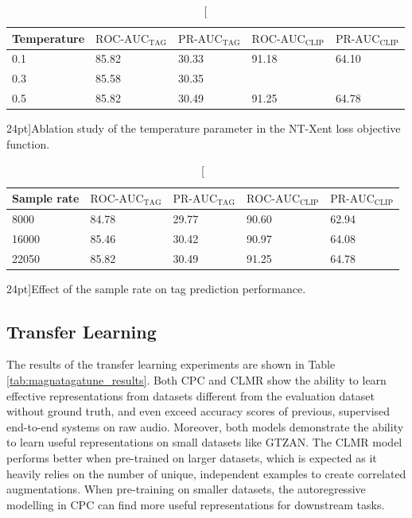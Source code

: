 \begin{table}
    \centering
    \begin{tabular}{lllll}\toprule
    Temperature & $\text{ROC-AUC}_{\text{TAG}}$ & $\text{PR-AUC}_{\text{TAG}}$ & $\text{ROC-AUC}_{\text{CLIP}}$ & $\text{PR-AUC}_{\text{CLIP}}$ \\\midrule
    0.1         & 85.82                         & 30.33                        & 91.18                          & 64.10                         \\
    0.3         & 85.58                         & 30.35                        &                                &                               \\
    0.5         & 85.82                         & 30.49                        & 91.25                          & 64.78 \\                       
    \bottomrule
    \end{tabular}
    \caption[][24pt]{Ablation study of the temperature parameter in the NT-Xent loss objective function.}
    \label{tab:temperature_ablation}
\end{table}
    
\begin{table}
    \centering
        \begin{tabular}{lllll}\toprule
        Sample rate & $\text{ROC-AUC}_{\text{TAG}}$ & $\text{PR-AUC}_{\text{TAG}}$ & $\text{ROC-AUC}_{\text{CLIP}}$ & $\text{PR-AUC}_{\text{CLIP}}$ \\\midrule
        8000 & 84.78 & 29.77 & 90.60 & 62.94 \\
        16000 & 85.46 & 30.42 & 90.97 & 64.08 \\
        22050 & 85.82 & 30.49 & 91.25 & 64.78 \\                       
        \bottomrule
        \end{tabular}
    \caption[][24pt]{Effect of the sample rate on tag prediction performance.}
    \label{tab:temperature_ablation}
\end{table}
    

\subsection{Transfer Learning}
The results of the transfer learning experiments are shown in Table \ref{tab:magnatagatune_results}.
Both CPC and CLMR show the ability to learn effective representations from datasets different from the evaluation dataset without ground truth, and even exceed accuracy scores of previous, supervised end-to-end systems on raw audio\cite{dieleman2014end}.
Moreover, both models demonstrate the ability to learn useful representations on small datasets like GTZAN.
The CLMR model performs better when pre-trained on larger datasets, which is expected as it heavily relies on the number of unique, independent examples to create correlated augmentations.
When pre-training on smaller datasets, the autoregressive modelling in CPC can find more useful representations for downstream tasks.

